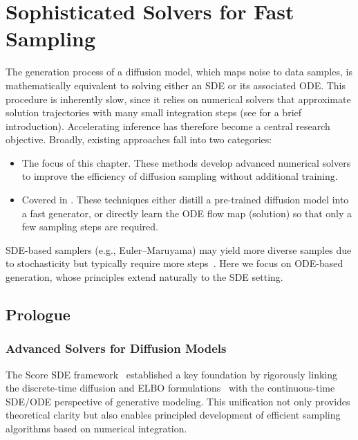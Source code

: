 \chapter{Sophisticated Solvers for Fast Sampling}\label{ch:solvers}


The generation process of a diffusion model, which maps noise to data samples, is mathematically equivalent to solving either an SDE or its associated ODE. This procedure is inherently slow, since it relies on numerical solvers that approximate solution trajectories with many small integration steps (see  for a brief introduction). Accelerating inference has therefore become a central research objective. Broadly, existing approaches fall into two categories:
\begin{itemize}
    \item {} The focus of this chapter. These methods develop advanced numerical solvers to improve the efficiency of diffusion sampling without additional training.
    \item {} Covered in . These techniques either distill a pre-trained diffusion model into a fast generator, or directly learn the ODE flow map (solution) so that only a few sampling steps are required.
\end{itemize}
SDE-based samplers (e.g., Euler--Maruyama) may yield more diverse samples due to stochasticity but typically require more steps~\citep{xu2023restart}. Here we focus on ODE-based generation, whose principles extend naturally to the SDE setting.




\clearpage




\section{Prologue}
\subsection{Advanced Solvers for Diffusion Models}

The Score SDE framework~\citep{song2020score} established a key foundation by rigorously linking the discrete-time diffusion and ELBO formulations~\citep{sohl2015deep,ho2020denoising} with the continuous-time SDE/ODE perspective of generative modeling. This unification not only provides theoretical clarity but also enables principled development of efficient sampling algorithms based on numerical integration.

